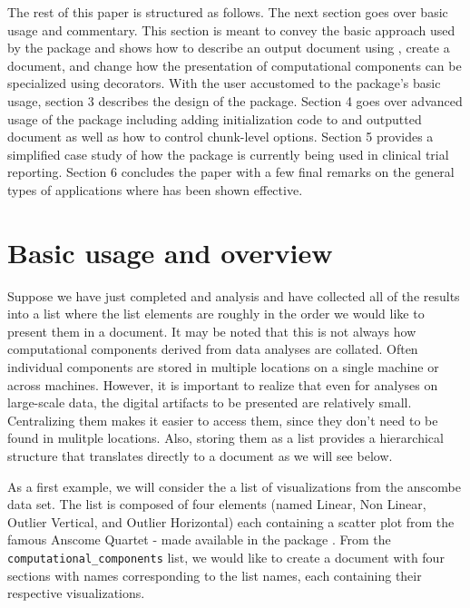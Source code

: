 \documentclass[
]{jss}
\begin{document}
The rest of this paper is structured as follows. The next section goes
over basic usage and commentary. This section is meant to convey the
basic approach used by the package and shows how to describe an output
document using , create a document, and change how the
presentation of computational components can be specialized using
 decorators. With the user accustomed to the package's
basic usage, section 3 describes the design of the package. Section 4
goes over advanced usage of the package including adding initialization
code to and outputted document as well as how to control chunk-level
options. Section 5 provides a simplified case study of how the package
is currently being used in clinical trial reporting. Section 6 concludes
the paper with a few final remarks on the general types of applications
where  has been shown effective.

\hypertarget{basic-usage-and-overview}{%
\section{Basic usage and overview}\label{basic-usage-and-overview}}

Suppose we have just completed and analysis and have collected all of
the results into a list where the list elements are roughly in the order
we would like to present them in a document. It may be noted that this
is not always how computational components derived from data analyses
are collated. Often individual components are stored in multiple
locations on a single machine or across machines. However, it is
important to realize that even for analyses on large-scale data, the
digital artifacts to be presented are relatively small. Centralizing
them makes it easier to access them, since they don't need to be found
in mulitple locations. Also, storing them as a list provides a
hierarchical structure that translates directly to a document as we will
see below.

As a first example, we will consider the a list of visualizations from
the anscombe data set. The list is composed of four 
\citep{wickham2016}elements (named Linear, Non Linear, Outlier Vertical,
and Outlier Horizontal) each containing a scatter plot from the famous
Anscome Quartet - made available in the  package
\citep{R}. From the \texttt{computational\_components} list, we would
like to create a document with four sections with names corresponding to
the list names, each containing their respective visualizations.
\end{document}
